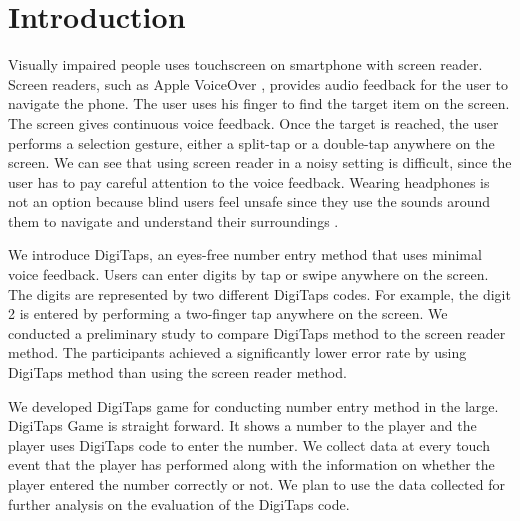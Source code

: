 \section{Introduction}
\label{sec:intro}

Visually impaired people uses touchscreen on smartphone with screen reader. Screen readers, such as Apple VoiceOver \cite{VoiceOver:2014}, provides audio feedback for the user to navigate the phone. The user uses his finger to find the target item on the screen. The screen gives continuous voice feedback. Once the target is reached, the user performs a selection gesture, either a split-tap or a double-tap anywhere on the screen. We can see that using screen reader in a noisy setting is difficult, since the user has to pay careful attention to the voice feedback. Wearing headphones is not an option because blind users feel unsafe since they use the sounds around them to navigate and understand their surroundings \cite{Azenkot:2011}.
\par
We introduce DigiTaps, an eyes-free number entry method that uses minimal voice feedback. Users can enter digits by tap or swipe anywhere on the screen. The digits are represented by two different DigiTaps codes. For example, the digit 2 is entered by performing a two-finger tap anywhere on the screen. We conducted a preliminary study to compare DigiTaps method to the screen reader method. The participants achieved a significantly lower error rate by using DigiTaps method than using the screen reader method.
\par
We developed DigiTaps game for conducting number entry method in the large. DigiTaps Game is straight forward. It shows a number to the player and the player uses DigiTaps code to enter the number. We collect data at every touch event that the player has performed along with the information on whether the player entered the number correctly or not. We plan to use the data collected for further analysis on the evaluation of the DigiTaps code.

\begin{comment}
Outline:
  - Background on why we come up with DigiTaps code: Continuous feedback hard to use in a noisy setting.
  - evidence of other method presented
  - why DigiTaps game? DigiTaps game is for what?

\end{comment}